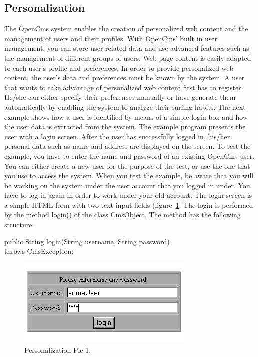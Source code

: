 \subsection {Personalization}
The OpenCms system enables the creation of personalized web content and
the management of users and their profiles. With OpenCms' built in user
management, you can store user-related data and use advanced features
such as the management of different groups of users.
Web page content is easily adapted to each user's profile and
preferences. In order to provide personalized web content, the user's
data and preferences must be known by the system. A user that wants to
take advantage of personalized web content first has to register. He/she
can either specify their preferences manually or have generate them
automatically by enabling the system to analyze their surfing habits.
The next example shows how a user is identified by means of a simple
login box and how the user data is extracted from the system. The
example program presents the user with a login screen. After the user
has successfully logged in, his/her personal data such as name and
address are displayed on the screen.
To test the example, you have to enter the name and password of an
existing OpenCms user. You can either create a new user for the purpose
of the test, or use the one that you use to access the system. When you
test the example, be aware that you will be working on the system under
the user account that you logged in under. You have to log in again in
order to work under your old account.
The login screen is a simple HTML form with two text input fields 
(figure~\ref{Password}. 
The login is performed by the method {\meth login()} of the class 
{\class CmsObject}. The method has the following structure:

{\code public String login(String username, String password)\\
throws CmsException;}

\begin{figure}
\begin{center}
\includegraphics[clip,width=0.4\linewidth]{pics/modules/48}
\end{center}
\caption[Personalization Pic 1 ]{Personalization Pic 1.}
\label{Password}
\end{figure}

